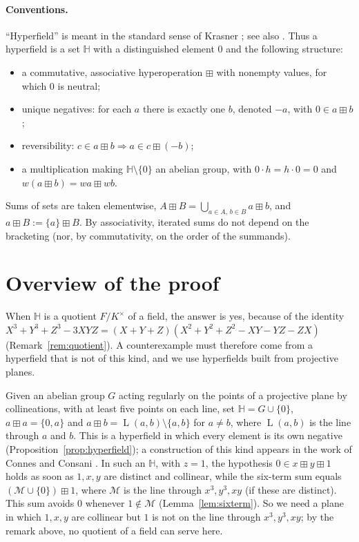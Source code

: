 \documentclass[11pt]{article}
\theoremstyle{definition}
\theoremstyle{remark}
\newcommand{\HH}{\mathbb{H}}
\newcommand{\bp}{\boxplus}
\DeclareMathOperator{\Ln}{L}
\begin{document}
\paragraph{Conventions.} ``Hyperfield'' is meant in the standard sense of Krasner \cite{Kr57,Kr83}; see also \cite{Viro,BB}. Thus a hyperfield is a set $\HH$ with a distinguished element $0$ and the following structure:
\begin{itemize}[nosep]
\item a commutative, associative hyperoperation $\bp$ with nonempty values, for which $0$ is neutral;
\item unique negatives: for each $a$ there is exactly one $b$, denoted $-a$, with $0\in a\bp b$;
\item reversibility: $c\in a\bp b\Rightarrow a\in c\bp(-b)$;
\item a multiplication making $\HH\setminus\{0\}$ an abelian group, with $0\cdot h=h\cdot 0=0$ and $w(a\bp b)=wa\bp wb$.
\end{itemize}
Sums of sets are taken elementwise, $A\bp B=\bigcup_{a\in A,\,b\in B}a\bp b$, and $a\bp B:=\{a\}\bp B$. By associativity, iterated sums do not depend on the bracketing (nor, by commutativity, on the order of the summands).

\section{Overview of the proof}

When $\HH$ is a quotient $F/K^\times$ of a field, the answer is yes, because of the identity $X^3+Y^3+Z^3-3XYZ=(X+Y+Z)(X^2+Y^2+Z^2-XY-YZ-ZX)$ (Remark~\ref{rem:quotient}). A counterexample must therefore come from a hyperfield that is not of this kind, and we use hyperfields built from projective planes.

Given an abelian group $G$ acting regularly on the points of a projective plane by collineations, with at least five points on each line, set $\HH=G\cup\{0\}$, $a\bp a=\{0,a\}$ and $a\bp b=\Ln(a,b)\setminus\{a,b\}$ for $a\neq b$, where $\Ln(a,b)$ is the line through $a$ and $b$. This is a hyperfield in which every element is its own negative (Proposition~\ref{prop:hyperfield}); a construction of this kind appears in the work of Connes and Consani \cite{CC}. In such an $\HH$, with $z=1$, the hypothesis $0\in x\bp y\bp 1$ holds as soon as $1,x,y$ are distinct and collinear, while the six-term sum equals $(\mathcal M\cup\{0\})\bp 1$, where $\mathcal M$ is the line through $x^3,y^3,xy$ (if these are distinct). This sum avoids $0$ whenever $1\notin\mathcal M$ (Lemma~\ref{lem:sixterm}). So we need a plane in which $1,x,y$ are collinear but $1$ is not on the line through $x^3,y^3,xy$; by the remark above, no quotient of a field can serve here.
\end{document}
